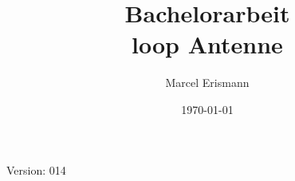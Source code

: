 \documentclass[10pt,a4paper]{article}
\author{Marcel Erismann}
\date{\today}
\title{Bachelorarbeit \\ \footnotesize{loop Antenne}}
\begin{document}
	
	Version: 014
	\tableofcontents 
	\newpage
	
\end{document}
